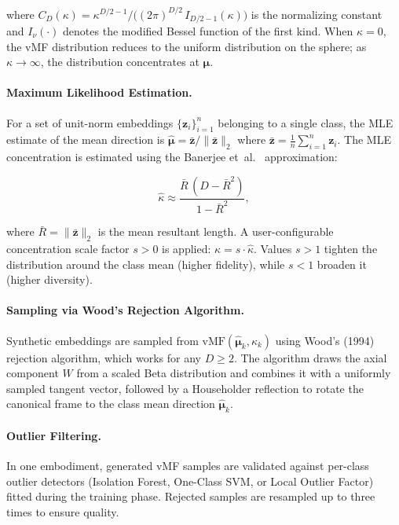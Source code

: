 \documentclass[12pt,letterpaper]{article}
\newcommand{\bz}{\mathbf{z}}
\newcommand{\bmu}{\bm{\mu}}
\begin{document}
where $C_D(\kappa) = \kappa^{D/2 - 1} /
\bigl((2\pi)^{D/2}\,I_{D/2-1}(\kappa)\bigr)$ is the normalizing constant
and $I_\nu(\cdot)$ denotes the modified Bessel function of the first kind.
When $\kappa = 0$, the vMF distribution reduces to the uniform distribution
on the sphere; as $\kappa \to \infty$, the distribution concentrates at
$\bmu$.

\paragraph{Maximum Likelihood Estimation.}

For a set of unit-norm embeddings $\{\bz_i\}_{i=1}^n$ belonging to a single
class, the MLE estimate of the mean direction is
$\hat{\bmu} = \bar{\bz} / \|\bar{\bz}\|_2$ where
$\bar{\bz} = \frac{1}{n}\sum_{i=1}^n \bz_i$.  The MLE concentration is
estimated using the Banerjee et~al.~\cite{banerjee2005} approximation:

\begin{equation}
  \hat{\kappa} \approx \frac{\bar{R}\,(D - \bar{R}^2)}{1 - \bar{R}^2},
  \label{eq:kappa_mle}
\end{equation}

where $\bar{R} = \|\bar{\bz}\|_2$ is the mean resultant length.  A
user-configurable concentration scale factor $s > 0$ is applied:
$\kappa = s \cdot \hat{\kappa}$.  Values $s > 1$ tighten the distribution
around the class mean (higher fidelity), while $s < 1$ broaden it (higher
diversity).

\paragraph{Sampling via Wood's Rejection Algorithm.}

Synthetic embeddings are sampled from $\text{vMF}(\hat{\bmu}_k, \kappa_k)$
using Wood's (1994)~\cite{wood1994} rejection algorithm, which works for any
$D \geq 2$.  The algorithm draws the axial component $W$ from a scaled Beta
distribution and combines it with a uniformly sampled tangent vector,
followed by a Householder reflection to rotate the canonical frame to the
class mean direction $\hat{\bmu}_k$.

\paragraph{Outlier Filtering.}

In one embodiment, generated vMF samples are validated against per-class
outlier detectors (Isolation Forest, One-Class SVM, or Local Outlier Factor)
fitted during the training phase.  Rejected samples are resampled up to
three times to ensure quality.
\end{document}
